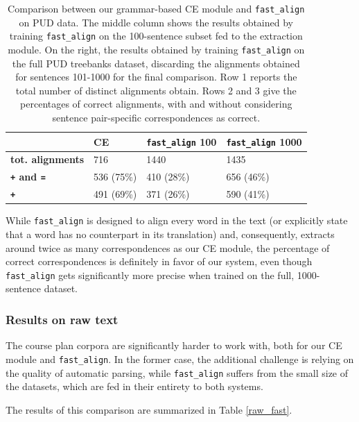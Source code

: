 \documentclass[11pt]{article}
\begin{document}
\begin{table}[h]
  \centering
  \small
  \begin{tabular}{l|lll}
   & \textbf{CE} & \textbf{\texttt{fast\_align} 100} & \textbf{\texttt{fast\_align} 1000}\\ \hline
   \textbf{tot. alignments} & 716 & 1440 & 1435 \\ 
   \textbf{\texttt{+} and \texttt{=}} & 536 (75\%) & 410 (28\%) & 656 (46\%)\\ 
   \textbf{\texttt{+}} & 491 (69\%) & 371 (26\%) & 590 (41\%)\\ 
  \end{tabular}
  \caption[Comparison between our grammar-based CE module and \texttt{fast\_align}]{Comparison between our grammar-based CE module and \texttt{fast\_align} on PUD data. The middle column shows the results obtained by training \texttt{fast\_align} on the 100-sentence subset fed to the extraction module. On the right, the results obtained by training \texttt{fast\_align} on the full PUD treebanks dataset, discarding the alignments obtained for sentences 101-1000 for the final comparison. Row 1 reports the total number of distinct alignments obtain. Rows 2 and 3 give the percentages of correct alignments, with and without considering sentence pair-specific correspondences as correct.}
  \label{pud_fast}
\end{table}

While \texttt{fast\_align} is designed to align every word in the text (or explicitly state that a word has no counterpart in its translation) and, consequently, extracts around twice as many correspondences as our CE module, the percentage of correct correspondences is definitely in favor of our system, even though \texttt{fast\_align} gets significantly more precise when trained on the full, 1000-sentence dataset. 

\subsubsection{Results on raw text} \label{raw}
The course plan corpora are significantly harder to work with, both for our CE module and \texttt{fast\_align}.
In the former case, the additional challenge is relying on the quality of automatic parsing, while \texttt{fast\_align} suffers from the small size of the datasets, which are fed in their entirety to both systems.

The results of this comparison are summarized in Table \ref{raw_fast}.
\end{document}
